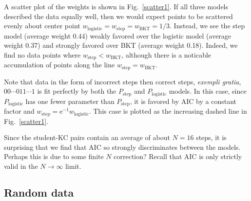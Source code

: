 \documentclass{acmlarge-edm}
\begin{document}
A scatter plot of the weights is shown in Fig.~\ref{scatter1}.
If all three models described the data equally well, then
we would expect points to be scattered evenly about 
center point $w_\mathrm{logistic}= w_\mathrm{step}= w_\mathrm{BKT}=1/3$.
Instead, we see the step model (average weight 0.44) weakly 
favored over the logistic model (average weight 0.37) and 
strongly favored over BKT (average weight 0.18).  Indeed, we 
find no data points where $w_\mathrm{step}< w_\mathrm{BKT}$,
although there is a noticable accumulation of points along the line 
$w_\mathrm{step}= w_\mathrm{BKT}$.

Note that data in the form of incorrect steps then correct steps, 
{\it exempli gratia}, $00\cdots 011\cdots 1$
is fit perfectly by both the $P_\mathrm{step}$ and 
$P_\mathrm{logistic}$ models.  
In this case, since $P_\mathrm{logistic}$ has one fewer parameter
than $P_\mathrm{step}$, it is favored by AIC by a constant factor and
$w_\mathrm{step}=\mathrm{e}^{-1} w_\mathrm{logistic}$.  This case is
plotted as the increasing dashed line in Fig.~\ref{scatter1}.

Since the student-KC pairs contain an average of about $N=16$ 
steps, it is surprising that we find that AIC so strongly
discriminates between the models.  Perhaps this is due to
some finite $N$ correction?  Recall that AIC is only 
strictly valid in the $N\to\infty$ limit.

\subsection{Random data}
\end{document}
